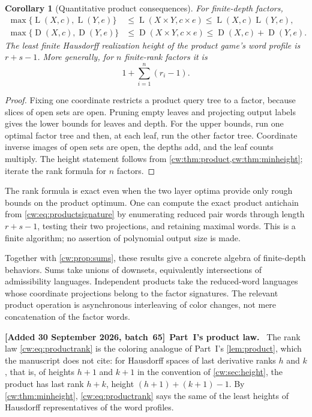 \documentclass[11pt,letterpaper]{article}
\numberwithin{equation}{section}
\newtheorem{corollary}[corollary]{Corollary}
\theoremstyle{definition}
\theoremstyle{remark}
\theoremstyle{definition}
\newcommand{\depth}{\operatorname{D}}
\newcommand{\layers}{\operatorname{L}}
\newenvironment{writenoted}[1][]{\par\smallskip\begingroup\small\sloppy
 \noindent\textbf{[Added 30 September 2026, batch~65]}\if\relax\detokenize{#1}\relax\else~\textbf{#1.}\fi\ }%
 {\par\endgroup\smallskip}
\begin{document}
\begin{corollary}[Quantitative product consequences]\label{cw:cor:productbounds}
For finite-depth factors,
\begin{align}
 \max\{\layers(X,c),\layers(Y,e)\}
 &\le \layers(X\times Y,c\times e)\le \layers(X,c)\layers(Y,e),\label{cw:eq:productlayers}\\
 \max\{\depth(X,c),\depth(Y,e)\}
 &\le\depth(X\times Y,c\times e)
 \le\depth(X,c)+\depth(Y,e).\label{cw:eq:productdepth}
\end{align}
The least finite Hausdorff realization height of the product game's word
profile is $r+s-1$. More generally, for $n$ finite-rank factors it is
\begin{equation}\label{cw:eq:nproduct}
 1+\sum_{i=1}^n(r_i-1).
\end{equation}
\end{corollary}
\begin{proof}
Fixing one coordinate restricts a product query tree to a factor, because
slices of open sets are open. Pruning empty leaves and projecting output
labels gives the lower bounds for leaves and depth. For the upper bounds,
run one optimal factor tree and then, at each leaf, run the other factor
tree. Coordinate inverse images of open sets are open, the depths add,
and the leaf counts multiply. The height statement follows from
\cref{cw:thm:product,cw:thm:minheight}; iterate the rank formula for $n$ factors.
\end{proof}

The rank formula is exact even when the two layer optima provide only rough
bounds on the product optimum. One can compute the exact product antichain
from \eqref{cw:eq:productsignature} by enumerating reduced pair words through
length $r+s-1$, testing their two projections, and retaining maximal words.
This is a finite algorithm; no assertion of polynomial output size is made.

Together with \cref{cw:prop:sums}, these results give a concrete algebra of
finite-depth behaviors. Sums take unions of downsets, equivalently intersections
of admissibility languages. Independent products take the reduced-word
languages whose coordinate projections belong to the factor signatures.
The relevant product operation is asynchronous interleaving of color changes,
not mere concatenation of the factor words.

\begin{writenoted}[Part~I's product law]
The rank law \eqref{cw:eq:productrank} is the coloring analogue of
Part~I's \cref{lem:product}, which the manuscript does not cite: for
Hausdorff spaces of last derivative ranks $h$ and $k$, that is, of
heights $h+1$ and $k+1$ in the convention of \cref{cw:sec:height}, the
product has last rank $h+k$, height $(h+1)+(k+1)-1$. By
\cref{cw:thm:minheight}, \eqref{cw:eq:productrank} says the same of the
least heights of Hausdorff representatives of the word profiles.
\end{writenoted}
\end{document}
